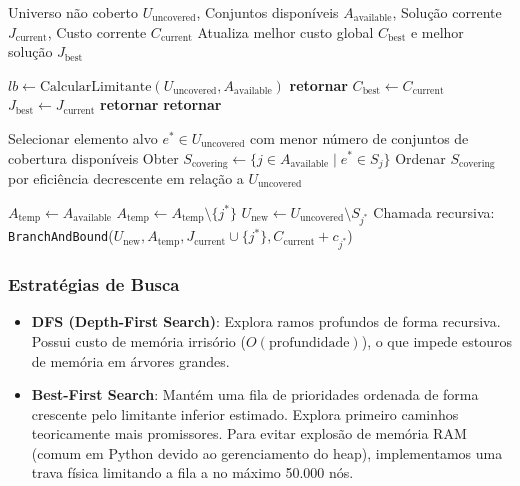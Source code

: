 \documentclass[conference]{IEEEtran}
\begin{document}
\begin{algorithm}
\caption{Algoritmo Branch-and-Bound (DFS)}
\label{alg:bb}
\begin{algorithmic}[1]
\REQUIRE Universo não coberto $U_{\text{uncovered}}$, Conjuntos disponíveis $A_{\text{available}}$, Solução corrente $J_{\text{current}}$, Custo corrente $C_{\text{current}}$
\ENSURE Atualiza melhor custo global $C_{\text{best}}$ e melhor solução $J_{\text{best}}$

\STATE $lb \leftarrow \text{CalcularLimitante}(U_{\text{uncovered}}, A_{\text{available}})$
    \STATE \textbf{retornar} 
\ENDIF
{}
        \STATE $C_{\text{best}} \leftarrow C_{\text{current}}$
        \STATE $J_{\text{best}} \leftarrow J_{\text{current}}$
    \ENDIF
    \STATE \textbf{retornar} 
\ENDIF
{}
    \STATE \textbf{retornar} 
\ENDIF

\STATE Selecionar elemento alvo $e^* \in U_{\text{uncovered}}$ com menor número de conjuntos de cobertura disponíveis
\STATE Obter $S_{\text{covering}} \leftarrow \{ j \in A_{\text{available}} \mid e^* \in S_j \}$
\STATE Ordenar $S_{\text{covering}}$ por eficiência decrescente em relação a $U_{\text{uncovered}}$

\STATE $A_{\text{temp}} \leftarrow A_{\text{available}}$
    \STATE $A_{\text{temp}} \leftarrow A_{\text{temp}} \setminus \{j^*\}$
    \STATE $U_{\text{new}} \leftarrow U_{\text{uncovered}} \setminus S_{j^*}$
    \STATE Chamada recursiva: \texttt{BranchAndBound}($U_{\text{new}}, A_{\text{temp}}, J_{\text{current}} \cup \{j^*\}, C_{\text{current}} + c_{j^*}$)
\ENDFOR
\end{algorithmic}
\end{algorithm}

\subsubsection{Estratégias de Busca}
\begin{itemize}
\item \textbf{DFS (Depth-First Search)}: Explora ramos profundos de forma recursiva. Possui custo de memória irrisório ($O(\text{profundidade})$), o que impede estouros de memória em árvores grandes.
\item \textbf{Best-First Search}: Mantém uma fila de prioridades ordenada de forma crescente pelo limitante inferior estimado. Explora primeiro caminhos teoricamente mais promissores. Para evitar explosão de memória RAM (comum em Python devido ao gerenciamento do heap), implementamos uma trava física limitando a fila a no máximo 50.000 nós.
\end{itemize}
\end{document}
